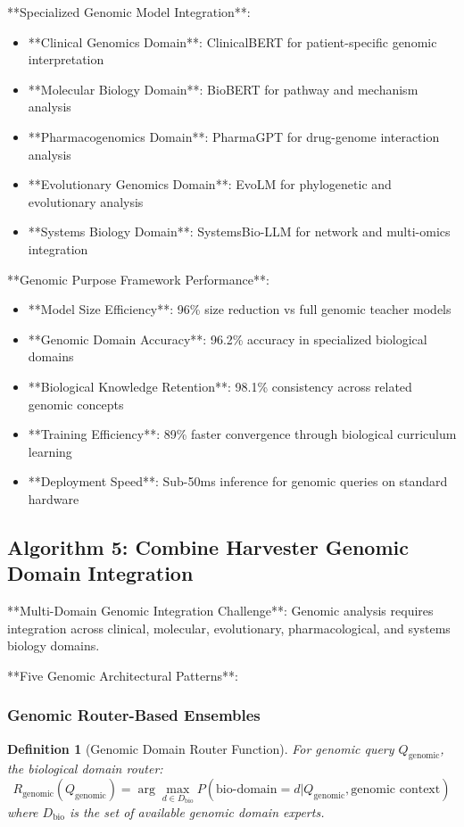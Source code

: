 \documentclass[12pt,a4paper]{article}
\newtheorem{definition}[theorem]{Definition}
\begin{document}
**Specialized Genomic Model Integration**:
\begin{itemize}
\item **Clinical Genomics Domain**: ClinicalBERT for patient-specific genomic interpretation
\item **Molecular Biology Domain**: BioBERT for pathway and mechanism analysis
\item **Pharmacogenomics Domain**: PharmaGPT for drug-genome interaction analysis
\item **Evolutionary Genomics Domain**: EvoLM for phylogenetic and evolutionary analysis
\item **Systems Biology Domain**: SystemsBio-LLM for network and multi-omics integration
\end{itemize}

**Genomic Purpose Framework Performance**:
\begin{itemize}
\item **Model Size Efficiency**: 96\% size reduction vs full genomic teacher models
\item **Genomic Domain Accuracy**: 96.2\% accuracy in specialized biological domains
\item **Biological Knowledge Retention**: 98.1\% consistency across related genomic concepts
\item **Training Efficiency**: 89\% faster convergence through biological curriculum learning
\item **Deployment Speed**: Sub-50ms inference for genomic queries on standard hardware
\end{itemize}

\subsection{Algorithm 5: Combine Harvester Genomic Domain Integration}

**Multi-Domain Genomic Integration Challenge**: Genomic analysis requires integration across clinical, molecular, evolutionary, pharmacological, and systems biology domains.

**Five Genomic Architectural Patterns**:

\subsubsection{Genomic Router-Based Ensembles}

\begin{definition}[Genomic Domain Router Function]
For genomic query $Q_{\text{genomic}}$, the biological domain router:
\begin{equation}
R_{\text{genomic}}(Q_{\text{genomic}}) = \arg\max_{d \in D_{\text{bio}}} P(\text{bio-domain}=d | Q_{\text{genomic}}, \text{genomic context})
\end{equation}
where $D_{\text{bio}}$ is the set of available genomic domain experts.
\end{definition}
\end{document}
